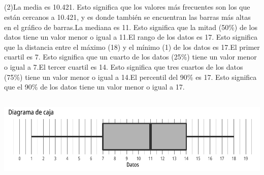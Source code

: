 \documentclass{cdplf-prueba}
\begin{document}
\subsection{}
\begin{tasks}[label={\tcbox[colback=black!60, colframe=black!60, coltext=white, on line, boxsep=0pt, left=3pt, right=3pt, top=2pt, bottom=2pt]{\sffamily\bfseries\alph*}},
item-indent=1.2cm,column-sep=20pt,label-offset=0.3cm,label-width=15pt,after-item-skip=10pt,item-format=\raggedright](2)\task La media es 10.421.
 Esto significa que los valores más frecuentes son los que están cercanos a 10.421, y es donde también se encuentran las barras más altas 
 en el gráfico de barras.\task La mediana es 11. 
 Esto significa que la mitad (50\%) de los datos tiene un valor menor 
 o igual a 11.\task El rango de los datos es 17. Esto 
 significa que la distancia entre el máximo (18) y el mínimo (1) de los datos es 17.\task El primer cuartil es 7. Esto significa que un cuarto de los datos (25\%) tiene un valor 
 menor o igual a 7.\task El tercer cuartil es 14. Esto significa que tres cuartos de los datos (75\%) tiene un valor menor
 o igual a 14.\task El percentil del 90\% es 17. Esto significa que el 90\% de los datos tiene un valor menor o igual a 17.\end{tasks}
\subsection{}
\begin{center}\includegraphics{diagrama_caja_3.pdf}\end{center}
\end{document}
